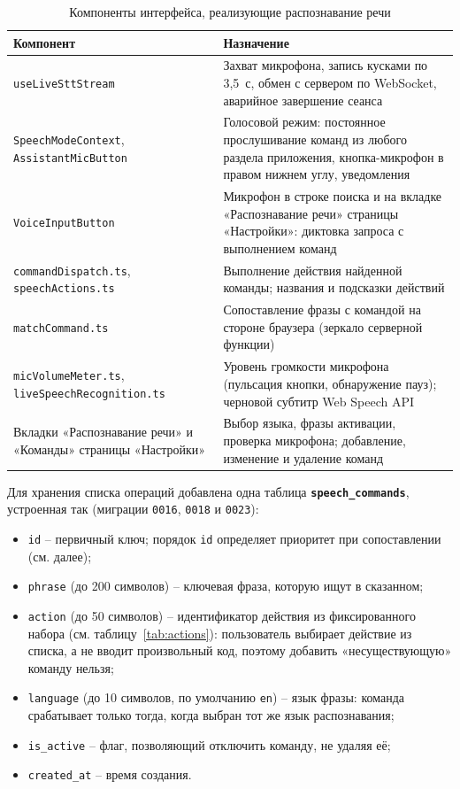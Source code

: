 \begin{table}[H]
  \centering
  \caption{Компоненты интерфейса, реализующие распознавание речи}
  \label{tab:frontend-components}
  \small
  \begin{tabular}{|p{}|p{}|}
    \hline
    \textbf{Компонент} & \textbf{Назначение} \\
    \hline
    \texttt{useLiveSttStream} & Захват микрофона, запись кусками по 3{,}5~с, обмен с сервером по WebSocket, аварийное завершение сеанса \\
    \hline
    \texttt{SpeechModeContext}, \texttt{AssistantMicButton} & Голосовой режим: постоянное прослушивание команд из любого раздела приложения, кнопка-микрофон в правом нижнем углу, уведомления \\
    \hline
    \texttt{VoiceInputButton} & Микрофон в строке поиска и на вкладке «Распознавание речи» страницы «Настройки»: диктовка запроса с выполнением команд \\
    \hline
    \texttt{commandDispatch.ts}, \texttt{speechActions.ts} & Выполнение действия найденной команды; названия и подсказки действий \\
    \hline
    \texttt{matchCommand.ts} & Сопоставление фразы с командой на стороне браузера (зеркало серверной функции) \\
    \hline
    \texttt{micVolumeMeter.ts}, \texttt{liveSpeechRecognition.ts} & Уровень громкости микрофона (пульсация кнопки, обнаружение пауз); черновой субтитр Web Speech API \\
    \hline
    Вкладки «Распознавание речи» и «Команды» страницы «Настройки» & Выбор языка, фразы активации, проверка микрофона; добавление, изменение и удаление команд \\
    \hline
  \end{tabular}
\end{table}


Для хранения списка операций добавлена одна таблица
\textbf{\texttt{speech\_commands}}, устроенная так (миграции \texttt{0016},
\texttt{0018} и \texttt{0023}):
\begin{itemize}
  \item \texttt{id} -- первичный ключ; порядок \texttt{id} определяет
  приоритет при сопоставлении (см. далее);
  \item \texttt{phrase} (до 200 символов) -- ключевая фраза, которую
  ищут в сказанном;
  \item \texttt{action} (до 50 символов) -- идентификатор действия из
  фиксированного набора (см. таблицу~\ref{tab:actions}): пользователь
  выбирает действие из списка, а не вводит произвольный код, поэтому
  добавить «несуществующую» команду нельзя;
  \item \texttt{language} (до 10 символов, по умолчанию \texttt{en}) --
  язык фразы: команда срабатывает только тогда, когда выбран тот же
  язык распознавания;
  \item \texttt{is\_active} -- флаг, позволяющий отключить команду,
  не удаляя её;
  \item \texttt{created\_at} -- время создания.
\end{itemize}

